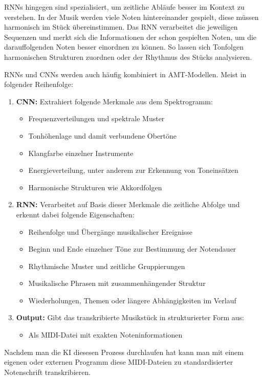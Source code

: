 RNNs hingegen sind spezialisiert, um zeitliche Abläufe besser im Kontext zu verstehen.
In der Musik werden viele Noten hintereinander gespielt, diese müssen harmonisch im Stück übereinstimmen.
Das RNN verarbeitet die jeweiligen Sequenzen und merkt sich die Informationen der schon gespielten Noten,
um die darauffolgenden Noten besser einordnen zu können.
So lassen sich Tonfolgen harmonischen Strukturen zuordnen oder der Rhythmus des Stücks analysieren.
\cite{Boeck2012}

RNNs und CNNs werden auch häufig kombiniert in AMT-Modellen.
Meist in folgender Reihenfolge:
\begin{enumerate}
    \item \textbf{CNN:} Extrahiert folgende Merkmale aus dem Spektrogramm:
    \begin{itemize}
        \item Frequenzverteilungen und spektrale Muster
        \item Tonhöhenlage und damit verbundene Obertöne
        \item Klangfarbe einzelner Instrumente
        \item Energieverteilung, unter anderem zur Erkennung von Toneinsätzen
        \item Harmonische Strukturen wie Akkordfolgen
    \end{itemize}

    \item \textbf{RNN:} Verarbeitet auf Basis dieser Merkmale die zeitliche Abfolge und erkennt dabei folgende Eigenschaften:
    \begin{itemize}
        \item Reihenfolge und Übergänge musikalischer Ereignisse
        \item Beginn und Ende einzelner Töne zur Bestimmung der Notendauer
        \item Rhythmische Muster und zeitliche Gruppierungen
        \item Musikalische Phrasen mit zusammenhängender Struktur
        \item Wiederholungen, Themen oder längere Abhängigkeiten im Verlauf
    \end{itemize}

    \item \textbf{Output:} Gibt das transkribierte Musikstück in strukturierter Form aus:
    \begin{itemize}
        \item Als MIDI-Datei mit exakten Noteninformationen
    \end{itemize}
\end{enumerate}
Nachdem man die KI diesesen Prozess durchlaufen hat kann man mit einem eigenen oder externen Programm
diese MIDI-Dateien zu standardisierter Notenschrift transkribieren.

